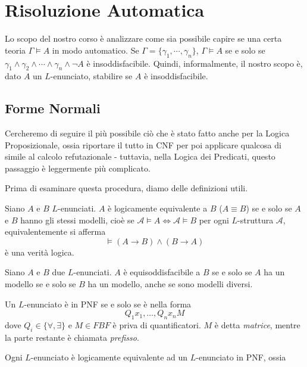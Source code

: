 \chapter{Risoluzione Automatica}
Lo scopo del nostro corso è analizzare come sia possibile capire se una certa 
teoria $\Gamma \models A$ in modo automatico. 
Se $\Gamma = \{\gamma_1, \cdots, \gamma_n\}$, $\Gamma \models A$ se e solo se 
$\gamma_1 \land \gamma_2 \land \cdots \land \gamma_n \land \neg A$ è insoddisfacibile. 
Quindi, informalmente, il nostro scopo è, dato $A$ un $L$-enunciato, stabilire se $A$ 
è insoddisfacibile. 


\section{Forme Normali}
Cercheremo di seguire il più possibile ciò che è stato fatto anche per la Logica 
Proposizionale, ossia riportare il tutto in CNF per poi applicare qualcosa 
di simile al calcolo refutazionale - tuttavia, nella Logica dei Predicati, 
questo passaggio è leggermente più complicato. 

Prima di esaminare questa procedura, diamo delle definizioni utili. 
\begin{defi}
Siano $A$ e  $B$ $L$-enunciati. $A$ è logicamente equivalente a $B$ ($A \equiv B$) 
se e solo se $A$ e $B$ hanno gli stessi modelli, 
cioè se $\mathcal{A} \models A \iff \mathcal{A} \models B$ per ogni $L$-struttura 
$\mathcal{A}$, equivalentemente si afferma 
$$
\models (A \rightarrow B) \land (B \rightarrow A) 
$$
è una verità logica. 
\end{defi}

\begin{defi}[Equisoddisfacibilità]
Siano $A$ e $B$ due $L$-enunciati. $A$ è equisoddisfacibile a $B$ se e solo se 
$A$ ha un modello se e solo se $B$ ha un modello, anche se sono modelli diversi. 
\end{defi}

\begin{defi}
        Un $L$-enunciato è in PNF se e solo se è nella forma 
        \[
        Q_1 x_1, \ldots, Q_n x_n M
        \]
        dove $Q_i \in \{ \forall, \exists\}$ e $M \in FBF$ è priva di quantificatori. 
        $M$ è detta \textit{matrice}, mentre la parte restante è chiamata 
        \textit{prefisso}.
\end{defi}
Ogni $L$-enunciato è logicamente equivalente ad un $L$-enunciato in PNF, 
ossia 

